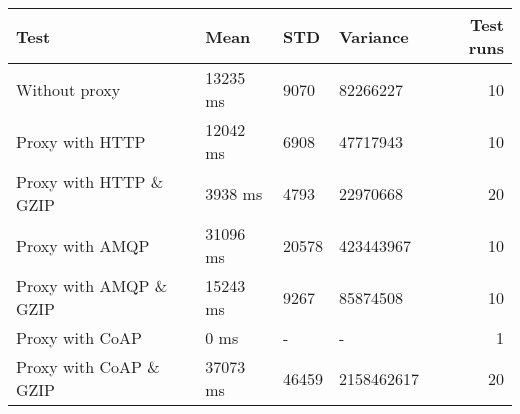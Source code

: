 \begin{tabularx}{\textwidth}{llllr}
\hline
 Test                   & Mean     & STD   & Variance   &   Test runs \\
\hline
 Without proxy          & 13235 ms & 9070  & 82266227   &          10 \\
 Proxy with HTTP        & 12042 ms & 6908  & 47717943   &          10 \\
 Proxy with HTTP \& GZIP & 3938 ms  & 4793  & 22970668   &          20 \\
 Proxy with AMQP        & 31096 ms & 20578 & 423443967  &          10 \\
 Proxy with AMQP \& GZIP & 15243 ms & 9267  & 85874508   &          10 \\
 Proxy with CoAP        & 0 ms     & -     & -          &           1 \\
 Proxy with CoAP \& GZIP & 37073 ms & 46459 & 2158462617 &          20 \\
\hline
\end{tabularx}